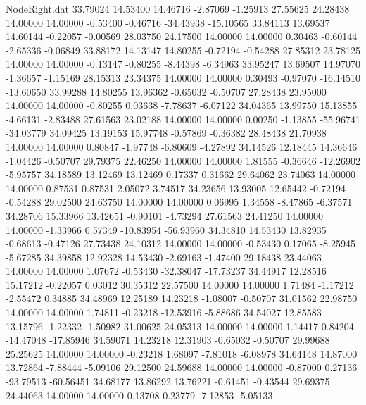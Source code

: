 \begin{filecontents}{NodeRight.dat}
  33.79024   14.53400   14.46716    -2.87069   -1.25913   27.55625   24.28438   14.00000   14.00000   -0.53400   -0.46716  -34.43938  -15.10565
  33.84113   13.69537   14.60144    -0.22057   -0.00569   28.03750   24.17500   14.00000   14.00000    0.30463   -0.60144   -2.65336   -0.06849
  33.88172   14.13147   14.80255    -0.72194   -0.54288   27.85312   23.78125   14.00000   14.00000   -0.13147   -0.80255   -8.44398   -6.34963
  33.95247   13.69507   14.97070    -1.36657   -1.15169   28.15313   23.34375   14.00000   14.00000    0.30493   -0.97070  -16.14510  -13.60650
  33.99288   14.80255   13.96362    -0.65032   -0.50707   27.28438   23.95000   14.00000   14.00000   -0.80255    0.03638   -7.78637   -6.07122
  34.04365   13.99750   15.13855    -4.66131   -2.83488   27.61563   23.02188   14.00000   14.00000    0.00250   -1.13855  -55.96741  -34.03779
  34.09425   13.19153   15.97748    -0.57869   -0.36382   28.48438   21.70938   14.00000   14.00000    0.80847   -1.97748   -6.80609   -4.27892
  34.14526   12.18445   14.36646    -1.04426   -0.50707   29.79375   22.46250   14.00000   14.00000    1.81555   -0.36646  -12.26902   -5.95757
  34.18589   13.12469   13.12469     0.17337    0.31662   29.64062   23.74063   14.00000   14.00000    0.87531    0.87531    2.05072    3.74517
  34.23656   13.93005   12.65442    -0.72194   -0.54288   29.02500   24.63750   14.00000   14.00000    0.06995    1.34558   -8.47865   -6.37571
  34.28706   15.33966   13.42651    -0.90101   -4.73294   27.61563   24.41250   14.00000   14.00000   -1.33966    0.57349  -10.83954  -56.93960
  34.34810   14.53430   13.82935    -0.68613   -0.47126   27.73438   24.10312   14.00000   14.00000   -0.53430    0.17065   -8.25945   -5.67285
  34.39858   12.92328   14.53430    -2.69163   -1.47400   29.18438   23.44063   14.00000   14.00000    1.07672   -0.53430  -32.38047  -17.73237
  34.44917   12.28516   15.17212    -0.22057    0.03012   30.35312   22.57500   14.00000   14.00000    1.71484   -1.17212   -2.55472    0.34885
  34.48969   12.25189   14.23218    -1.08007   -0.50707   31.01562   22.98750   14.00000   14.00000    1.74811   -0.23218  -12.53916   -5.88686
  34.54027   12.85583   13.15796    -1.22332   -1.50982   31.00625   24.05313   14.00000   14.00000    1.14417    0.84204  -14.47048  -17.85946
  34.59071   14.23218   12.31903    -0.65032   -0.50707   29.99688   25.25625   14.00000   14.00000   -0.23218    1.68097   -7.81018   -6.08978
  34.64148   14.87000   13.72864    -7.88444   -5.09106   29.12500   24.59688   14.00000   14.00000   -0.87000    0.27136  -93.79513  -60.56451
  34.68177   13.86292   13.76221    -0.61451   -0.43544   29.69375   24.44063   14.00000   14.00000    0.13708    0.23779   -7.12853   -5.05133

\end{filecontents}
